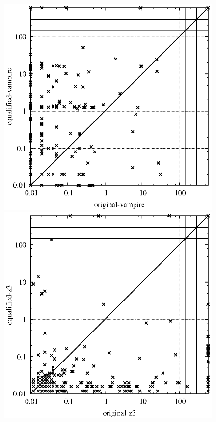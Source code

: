 \documentclass{article}
\begin{document}
\begin{figure}[t]
\begin{center}
\includegraphics[scale=0.65,trim=10mm 0mm 20mm 0mm]{Plots/Equalified/Vampire/test_original_vampire_equalified_vampire_300.eps}\\
\includegraphics[scale=0.65,trim=10mm 0mm 20mm 0mm]{Plots/Equalified/Z3/test_original_z3_equalified_z3_300.eps}

\end{center}
\end{figure}
\end{document}

